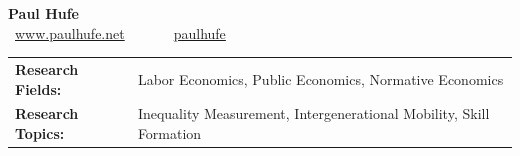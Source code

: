 \documentclass[10pt, a4paper]{article}
\begin{document}
\begin{center}
{\LARGE \centering \textbf{Paul Hufe}}\\
{\small \faMousePointer~\href{https://www.paulhufe.net}{www.paulhufe.net}~~~~~~\faTwitter~\href{https://twitter.com/paulhufe?lang=de}{paulhufe}}
\end{center}

\vspace{.5cm}
\begin{tabular}{@{}p{4.5cm}@{}p{13.5cm}}
\textbf{Research Fields:}& Labor Economics, Public Economics, Normative Economics\\
\textbf{Research Topics:}& Inequality Measurement, Intergenerational Mobility, Skill Formation
\end{tabular}

 \vspace{.5cm}		
%
%

\end{document}
